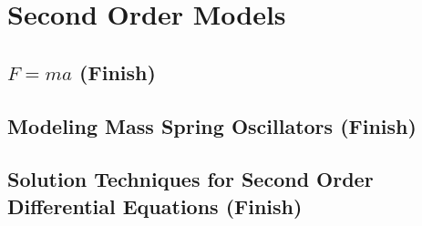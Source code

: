 \chapter{Second Order Models}

\section{$F = ma$ (Finish)}

\section{Modeling Mass Spring Oscillators (Finish)}

\section{Solution Techniques for Second Order Differential Equations (Finish)}
